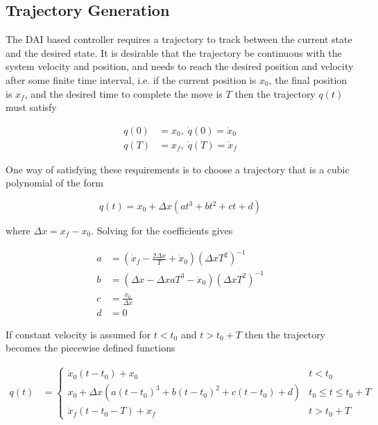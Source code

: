 \documentclass[applsci,article,submit,pdftex,moreauthors]{Definitions/mdpi}
\begin{document}
\begin{paracol}{2}
\subsection{Trajectory Generation}
The DAI based controller requires a trajectory to track between the current state and the desired state. It is desirable that the trajectory be continuous with the system velocity and position, and needs to reach the desired position and velocity after some finite time interval, i.e. if the current position is $x_0$, the final position is $x_f$, and the desired time to complete the move is $T$ then the trajectory $q(t)$ must satisfy
\begin{linenomath}
\begin{align}
  q(0) &= x_0, \;
  \dot{q}(0) = \dot{x}_0 \\  
  q(T) &= x_f, \;
  \dot{q}(T) = \dot{x}_f
\end{align}
\end{linenomath}
One way of satisfying these requirements is to choose a trajectory that is a cubic polynomial of the form
\begin{linenomath}
\begin{equation}
  \label{eq:q(t)}
  q(t) =  x_0 + \Delta x(at^3 + bt^2 + ct + d)
\end{equation}
\end{linenomath}
where $\Delta x = x_f - x_0$. Solving for the coefficients gives
\begin{linenomath}
\begin{align}
  a &= (\dot{x}_f - \frac{2\Delta x}{T} + \dot{x}_0)(\Delta xT^2)^{-1}\\
  b &= (\Delta x - \Delta xaT^3 - \dot{x}_0)(\Delta xT^2)^{-1}\\
  c &= \frac{\dot{x}_0}{\Delta x} \\
  d &= 0
\end{align}
\end{linenomath}
If constant velocity is assumed for  $t < t_0$ and $t > t_0 + T$ then the trajectory becomes the piecewise defined functions
\begin{linenomath}
\begin{align}
  q(t) &=
  \begin{cases}
    \dot{x}_0(t - t_0) + x_0 & t < t_0\\
    x_0 + \Delta x(a(t - t_0)^3 + b(t - t_0)^2 + c(t - t_0) + d) & t_0 \leq t \leq t_0 + T\\
    \dot{x}_f(t - t_0 - T) + x_f & t > t_0 + T
  \end{cases} \label{eq:q}\\

\end{align}
\end{linenomath}
\end{paracol}
\end{document}
